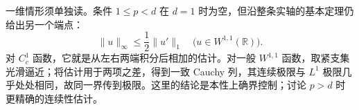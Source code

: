 \ProseParagraphBreak

一维情形须单独读。条件 \(1\leq p<d\) 在 \(d=1\) 时为空，但沿整条实轴的基本定理仍给出另一个端点：
\[
 \|u\|_\infty\leq\frac12\|u'\|_1
 \quad\bigl(u\in W^{1,1}(\mathbb R)\bigr).
\]
对 \(C_c^1\) 函数，它就是从左右两端积分后相加的估计。对一般
\(W^{1,1}\) 函数，取紧支集光滑逼近；将估计用于两项之差，得到一致 Cauchy 列，其连续极限与 \(L^1\) 极限几乎处处相同，故同一界传到极限。这里的结论是本性上确界控制；讨论 \(p>d\) 时更精确的连续性估计。
